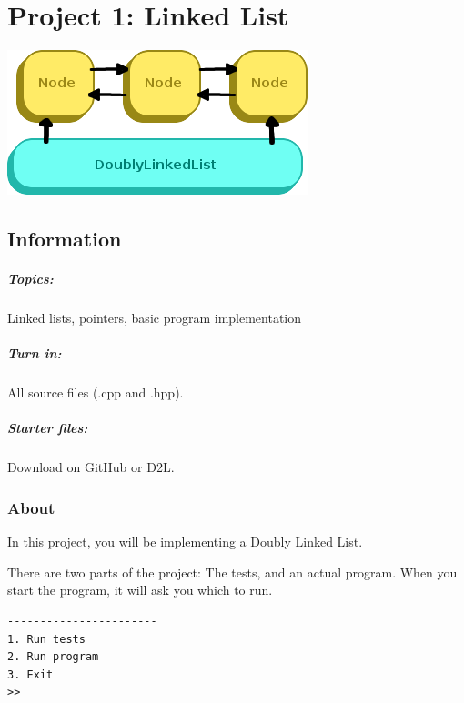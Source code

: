 \documentclass[a4paper,12pt,oneside]{book}
\title{}
\author{Rachel Morris}
\date{\today}
\begin{document}
    \chapter*{Project 1: Linked List} 
    
        \begin{center}
            \includegraphics{images/linked-list-title.png}
        \end{center}

        \section{Information}
            \paragraph{ Topics: } Linked lists, pointers, basic program implementation
            \paragraph{ Turn in: } All source files (.cpp and .hpp).
            \paragraph{ Starter files: } Download on GitHub or D2L.
        
        \subsection{About}
    
            In this project, you will be implementing a Doubly Linked List.
            
            There are two parts of the project: The tests, and an actual program.
            When you start the program, it will ask you which to run.
            
\begin{lstlisting}[style=output]
-----------------------
1. Run tests
2. Run program
3. Exit
>> 
\end{lstlisting}
\end{document}
